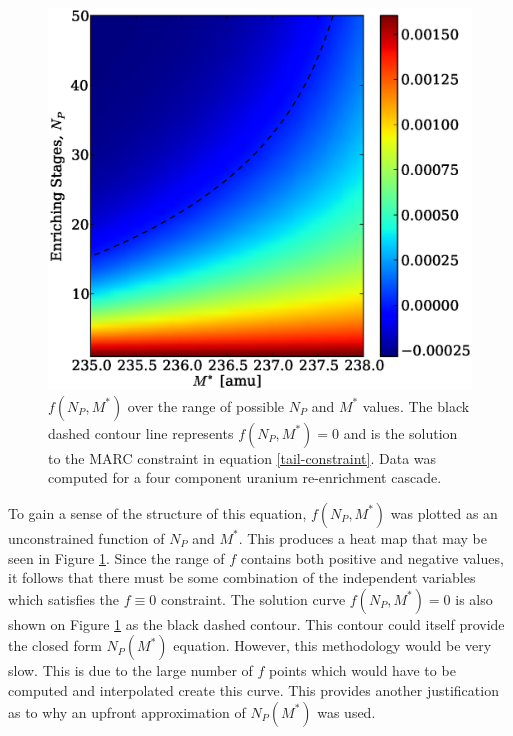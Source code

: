 \documentclass{ansconf}
\begin{document}
\begin{figure}[htpb]
\begin{center}
\includegraphics[scale=0.5]{np_constraint.eps}
\caption{$f(N_P, M^*)$ over the range of possible $N_P$ and $M^*$ values.  The black
dashed contour line represents $f(N_P, M^*)=0$ and is the solution to the MARC 
constraint in equation \ref{tail-constraint}. 
Data was computed for a four component uranium re-enrichment cascade.}
\label{np_constraint_fig}
\end{center}
\end{figure}

To gain a sense of the structure of this equation, $f(N_P,M^*)$ was plotted as an 
unconstrained function of $N_P$ and $M^*$.
This produces a heat map that may be seen in Figure \ref{np_constraint_fig}.  
Since the range of $f$ contains both positive and negative
values, it follows that there must be some combination of the independent variables 
which satisfies the $f\equiv 0$ constraint.  The solution curve $f(N_P, M^*)=0$ is 
also shown on Figure \ref{np_constraint_fig} as the black dashed contour.  
This contour could itself provide the closed form $N_P(M^*)$ equation.
However, this methodology would be very slow.  
This is due to the large number of $f$ points which would have to be 
computed and interpolated create this curve.  This provides another 
justification as to 
why an upfront approximation of $N_P(M^*)$ was used.
\end{document}
